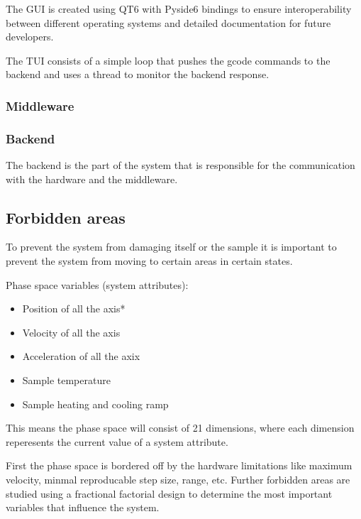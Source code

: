 \documentclass[11pt]{article}
\begin{document}
The GUI is created using QT6 with Pyside6 bindings  to ensure interoperability between different operating systems and detailed documentation for future developers.

The TUI consists of a simple loop that pushes the gcode commands to the backend and uses a thread to monitor the backend response.

\subsubsection{Middleware}

\subsubsection{Backend}
The backend is the part of the system that is responsible for the communication with the hardware and the middleware.


\subsection{Forbidden areas}
To prevent the system from damaging itself or the sample it is important to prevent the system from moving to certain areas in certain states.

Phase space variables (system attributes):
\begin{itemize}
    \item Position of all the axis*
    \item Velocity of all the axis
    \item Acceleration of all the axix
    \item Sample temperature
    \item Sample heating and cooling ramp
\end{itemize}

This means the phase space will consist of 21 dimensions, where each dimension reperesents the current value of a system attribute.

First the phase space is bordered off by the hardware limitations like maximum velocity, minmal reproducable step size, range, etc.
Further forbidden areas are studied using a fractional factorial design to determine the most important variables that influence the system.
\end{document}
